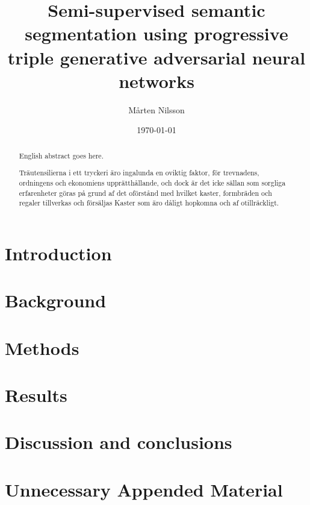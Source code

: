 \documentclass{kththesis}
\title{Semi-supervised semantic segmentation using progressive triple generative adversarial neural networks}
\author{Mårten Nilsson}
\date{\today}
\begin{document}
\frontmatter

\titlepage

\begin{abstract}
  English abstract goes here.

  \blindtext
\end{abstract}


\begin{otherlanguage}{swedish}
  \begin{abstract}
    Träutensilierna i ett tryckeri äro ingalunda en oviktig faktor,
    för trevnadens, ordningens och ekonomiens upprätthållande, och
    dock är det icke sällan som sorgliga erfarenheter göras på grund
    af det oförstånd med hvilket kaster, formbräden och regaler
    tillverkas och försäljas Kaster som äro dåligt hopkomna och af
    otillräckligt.
  \end{abstract}
\end{otherlanguage}


\tableofcontents


\mainmatter


\chapter{Introduction}



\chapter{Background}



\chapter{Methods}



\chapter{Results}

\chapter{Discussion and conclusions}


\printbibliography[heading=bibintoc] %

\appendix

\chapter{Unnecessary Appended Material}
\end{document}
